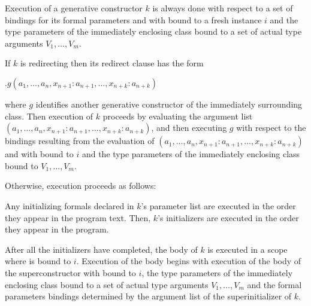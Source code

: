 \documentclass{article}
\newcommand{\code}[1]{{\sf #1}}
\begin{document}
\LMHash{}
Execution of a generative constructor $k$ is always done with respect to a set of bindings for its formal parameters and with  \THIS{} bound to a fresh instance $i$ and the type parameters of the immediately enclosing class bound to a set of actual type arguments $V_1, \ldots , V_m$. 


\LMHash{}
If $k$ is redirecting then its redirect clause has the form 

\THIS{}$.g(a_1, \ldots , a_n, x_{n+1}: a_{n+1}, \ldots , x_{n+k}: a_{n+k})$ 

where $g$ identifies another  generative constructor of the immediately surrounding class. Then execution of $k$ proceeds by evaluating the argument list $(a_1, \ldots , a_n, x_{n+1}: a_{n+1}, \ldots , x_{n+k}: a_{n+k})$, and then executing $g$ with respect to the bindings resulting from the evaluation of $(a_1, \ldots , a_n, x_{n+1}: a_{n+1}, \ldots , x_{n+k}: a_{n+k})$ and with  \THIS{} bound to $i$ and the type parameters of the immediately enclosing class bound to $V_1, \ldots , V_m$. 

\LMHash{}
Otherwise, execution  proceeds as follows:

\LMHash{}
Any initializing formals declared in $k$'s parameter list are executed in the order they appear in the program text.  
Then, $k$'s  initializers are executed in the order they appear in the program.


\LMHash{}
After all the initializers  have completed, the body of $k$ is executed  in a scope where \THIS{} is bound to $i$. Execution of the body begins with execution of the body of the superconstructor  with \THIS{} bound to $i$, the type parameters of the immediately enclosing class bound to a set of actual type arguments $V_1, \ldots , V_m$ and the formal parameters bindings determined by the argument list of the superinitializer of $k$.
\end{document}
